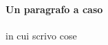 \documentclass[12pt, a4paper, openany]{book}
\begin{document}
\begin{mybox}
\lipsum[4]
\end{mybox}

\begin{esempio}
\lipsum[1]
\end{esempio}

\paragraph*{Un paragrafo a caso} in cui scrivo cose \lipsum[2]
\end{document}
